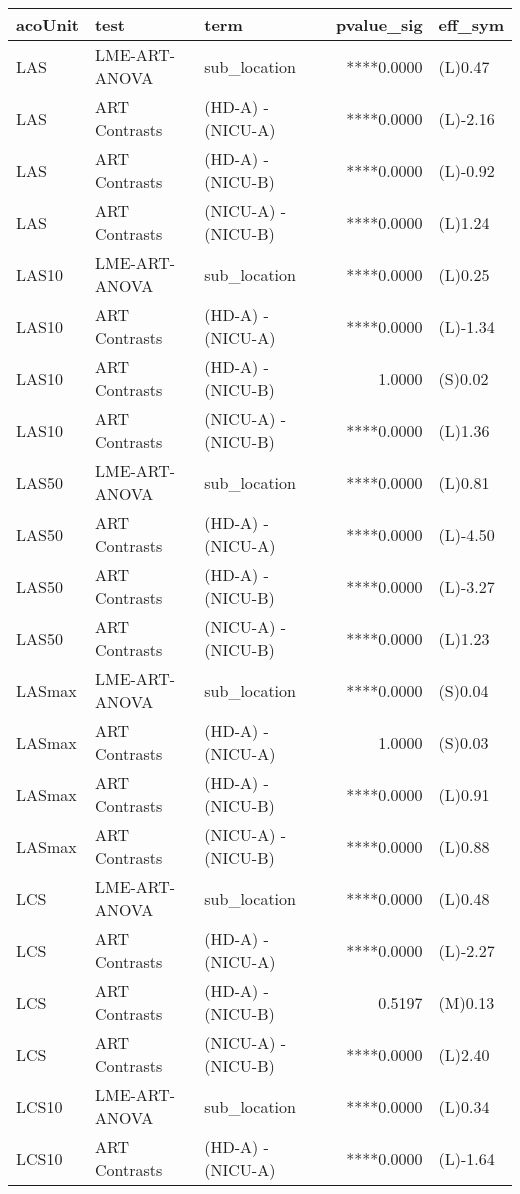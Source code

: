 \begin{table}
\fontsize{12.0pt}{14.4pt}\selectfont
\begin{tabular*}{\linewidth}{@{\extracolsep{\fill}}lllrl}
\toprule
acoUnit & test & term & pvalue\_sig & eff\_sym \\ 
\midrule\addlinespace[2.5pt]
LAS & LME-ART-ANOVA & sub\_location & ****0.0000 & (L)0.47 \\ 
LAS & ART Contrasts & (HD-A) - (NICU-A) & ****0.0000 & (L)-2.16 \\ 
LAS & ART Contrasts & (HD-A) - (NICU-B) & ****0.0000 & (L)-0.92 \\ 
LAS & ART Contrasts & (NICU-A) - (NICU-B) & ****0.0000 & (L)1.24 \\ 
LAS10 & LME-ART-ANOVA & sub\_location & ****0.0000 & (L)0.25 \\ 
LAS10 & ART Contrasts & (HD-A) - (NICU-A) & ****0.0000 & (L)-1.34 \\ 
LAS10 & ART Contrasts & (HD-A) - (NICU-B) &  1.0000 & (S)0.02 \\ 
LAS10 & ART Contrasts & (NICU-A) - (NICU-B) & ****0.0000 & (L)1.36 \\ 
LAS50 & LME-ART-ANOVA & sub\_location & ****0.0000 & (L)0.81 \\ 
LAS50 & ART Contrasts & (HD-A) - (NICU-A) & ****0.0000 & (L)-4.50 \\ 
LAS50 & ART Contrasts & (HD-A) - (NICU-B) & ****0.0000 & (L)-3.27 \\ 
LAS50 & ART Contrasts & (NICU-A) - (NICU-B) & ****0.0000 & (L)1.23 \\ 
LASmax & LME-ART-ANOVA & sub\_location & ****0.0000 & (S)0.04 \\ 
LASmax & ART Contrasts & (HD-A) - (NICU-A) &  1.0000 & (S)0.03 \\ 
LASmax & ART Contrasts & (HD-A) - (NICU-B) & ****0.0000 & (L)0.91 \\ 
LASmax & ART Contrasts & (NICU-A) - (NICU-B) & ****0.0000 & (L)0.88 \\ 
LCS & LME-ART-ANOVA & sub\_location & ****0.0000 & (L)0.48 \\ 
LCS & ART Contrasts & (HD-A) - (NICU-A) & ****0.0000 & (L)-2.27 \\ 
LCS & ART Contrasts & (HD-A) - (NICU-B) &  0.5197 & (M)0.13 \\ 
LCS & ART Contrasts & (NICU-A) - (NICU-B) & ****0.0000 & (L)2.40 \\ 
LCS10 & LME-ART-ANOVA & sub\_location & ****0.0000 & (L)0.34 \\ 
LCS10 & ART Contrasts & (HD-A) - (NICU-A) & ****0.0000 & (L)-1.64 \\ 

\end{tabular*}
\end{table}
